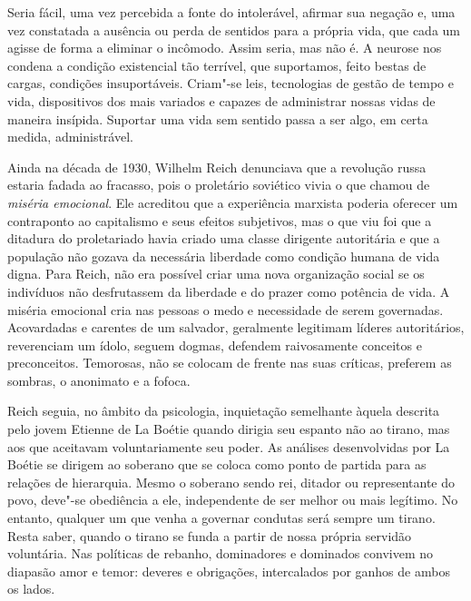 Seria fácil, uma vez percebida a fonte do intolerável, afirmar sua
negação e, uma vez constatada a ausência ou perda de sentidos para a
própria vida, que cada um agisse de forma a eliminar o incômodo. Assim
seria, mas não é. A neurose nos condena a condição existencial tão
terrível, que suportamos, feito bestas de cargas, condições
insuportáveis. Criam"-se leis, tecnologias de gestão de tempo e vida,
dispositivos dos mais variados e capazes de administrar nossas vidas de
maneira insípida. Suportar uma vida sem sentido passa a ser algo, em
certa medida, administrável.

Ainda na década de 1930, Wilhelm Reich denunciava que a revolução russa
estaria fadada ao fracasso, pois o proletário soviético vivia o que
chamou de \emph{miséria emocional}. Ele acreditou que a experiência
marxista poderia oferecer um contraponto ao capitalismo e seus efeitos
subjetivos, mas o que viu foi que a ditadura do proletariado havia
criado uma classe dirigente autoritária e que a população não gozava da
necessária liberdade como condição humana de vida digna. Para Reich, não
era possível criar uma nova organização social se os indivíduos não
desfrutassem da liberdade e do prazer como potência de vida. A miséria
emocional cria nas pessoas o medo e necessidade de serem governadas.
Acovardadas e carentes de um salvador, geralmente legitimam líderes
autoritários, reverenciam um ídolo, seguem dogmas, defendem raivosamente
conceitos e preconceitos. Temorosas, não se colocam de frente nas suas
críticas, preferem as sombras, o anonimato e a fofoca.

Reich seguia, no âmbito da psicologia, inquietação semelhante àquela
descrita pelo jovem Etienne de La Boétie quando dirigia seu espanto não
ao tirano, mas aos que aceitavam voluntariamente seu poder. As análises
desenvolvidas por La Boétie se dirigem ao soberano que se coloca como
ponto de partida para as relações de hierarquia. Mesmo o soberano sendo
rei, ditador ou representante do povo, deve"-se obediência a ele,
independente de ser melhor ou mais legítimo. No entanto, qualquer um que
venha a governar condutas será sempre um tirano. Resta saber, quando o
tirano se funda a partir de nossa própria servidão voluntária. Nas
políticas de rebanho, dominadores e dominados convivem no diapasão amor
e temor: deveres e obrigações, intercalados por ganhos de ambos os
lados.

